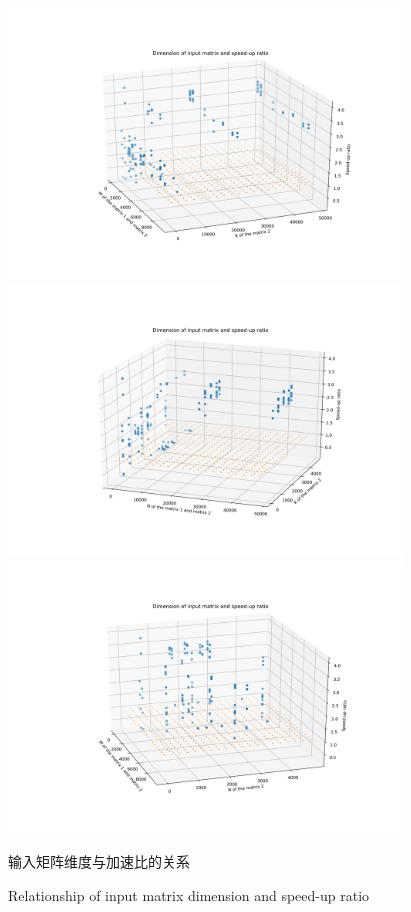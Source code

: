 \begin{figure}
	\centering
	\includegraphics[height=7.2cm]{figures/GEMM_MK.jpg}\\
	\includegraphics[height=7.2cm]{figures/GEMM_NK.jpg}\\
	\includegraphics[height=7.2cm]{figures/GEMM_MN.jpg}
	\renewcommand{\thefigure}{\arabic{section}-\arabic{figure} }
	\renewcommand{\figurename}{图}
	\caption{输入矩阵维度与加速比的关系}
	\addtocounter{figure}{-1}
	\renewcommand{\thefigure}{\arabic{section}-\arabic{figure} }
	\renewcommand{\figurename}{Figure}
	\caption{Relationship of input matrix dimension and speed-up ratio}
	\label{Fig-MNKRatio}
\end{figure}
